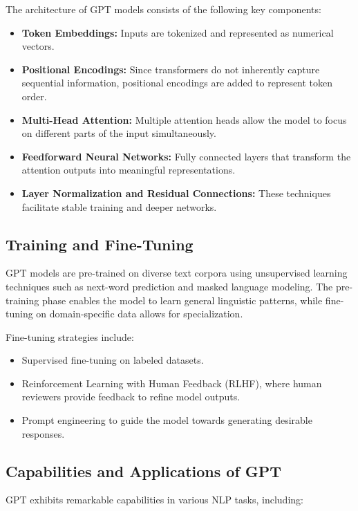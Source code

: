 The architecture of GPT models consists of the following key components:

\begin{itemize}
    \item \textbf{Token Embeddings:} Inputs are tokenized and represented as numerical vectors.
    \item \textbf{Positional Encodings:} Since transformers do not inherently capture sequential information, positional encodings are added to represent token order.
    \item \textbf{Multi-Head Attention:} Multiple attention heads allow the model to focus on different parts of the input simultaneously.
    \item \textbf{Feedforward Neural Networks:} Fully connected layers that transform the attention outputs into meaningful representations.
    \item \textbf{Layer Normalization and Residual Connections:} These techniques facilitate stable training and deeper networks.
\end{itemize}

\subsection{Training and Fine-Tuning}

GPT models are pre-trained on diverse text corpora using unsupervised learning techniques such as next-word prediction and masked language modeling. The pre-training phase enables the model to learn general linguistic patterns, while fine-tuning on domain-specific data allows for specialization.

Fine-tuning strategies include:

\begin{itemize}
    \item Supervised fine-tuning on labeled datasets.
    \item Reinforcement Learning with Human Feedback (RLHF), where human reviewers provide feedback to refine model outputs.
    \item Prompt engineering to guide the model towards generating desirable responses.
\end{itemize}

\subsection{Capabilities and Applications of GPT}

GPT exhibits remarkable capabilities in various NLP tasks, including:


